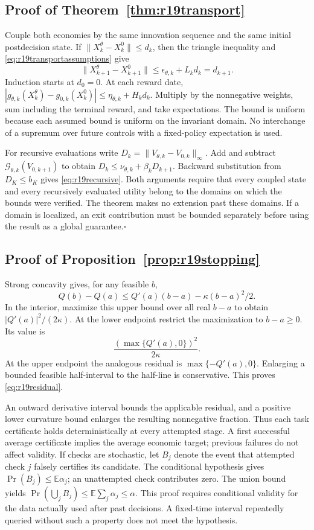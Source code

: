 \documentclass[ecta,nameyear,draft]{econsocart}
\theoremstyle{definition}
\theoremstyle{remark}
\newcommand{\E}{\mathbb E}
\begin{document}
\subsection{Proof of Theorem~\ref{thm:r19transport}}
Couple both economies by the same innovation sequence and the same initial
postdecision state. If $\|X_k^\theta-X_k^0\|\leq d_k$, then the triangle
inequality and \eqref{eq:r19transportassumptions} give
\[
 \|X_{k+1}^\theta-X_{k+1}^0\|
 \leq\epsilon_{\theta,k}+L_kd_k=d_{k+1}.
\]
Induction starts at $d_0=0$. At each reward date,
$|g_{\theta,k}(X_k^\theta)-g_{0,k}(X_k^0)|
 \leq\eta_{\theta,k}+H_kd_k$.
Multiply by the nonnegative weights, sum including the terminal reward,
and take expectations. The bound is uniform because each assumed bound is
uniform on the invariant domain. No interchange of a supremum over future
controls with a fixed-policy expectation is used.

For recursive evaluations write
$D_k=\|V_{\theta,k}-V_{0,k}\|_\infty$. Add and subtract
$\mathcal G_{\theta,k}(V_{0,k+1})$ to obtain
$D_k\leq\nu_{\theta,k}+\beta_kD_{k+1}$.
Backward substitution from $D_K\leq b_K$ gives
\eqref{eq:r19recursive}. Both arguments require that every coupled state
and every recursively evaluated utility belong to the domains on which the
bounds were verified. The theorem makes no extension past these domains.
If a domain is localized, an exit contribution must be bounded separately
before using the result as a global guarantee.\hfill$\square$

\subsection{Proof of Proposition~\ref{prop:r19stopping}}
Strong concavity gives, for any feasible $b$,
\[
 Q(b)-Q(a)\leq Q'(a)(b-a)-\kappa(b-a)^2/2.
\]
In the interior, maximize this upper bound over all real $b-a$ to obtain
$|Q'(a)|^2/(2\kappa)$. At the lower endpoint restrict the maximization to $b-a\geq0$.
Its value is
\[
 \frac{(\max\{Q'(a),0\})^2}{2\kappa}.
\]
At the upper endpoint the analogous residual is $\max\{-Q'(a),0\}$. Enlarging a bounded
feasible half-interval to the half-line is conservative. This proves
\eqref{eq:r19residual}.

An outward derivative interval bounds the applicable residual, and a positive
lower curvature bound enlarges the resulting nonnegative fraction. Thus each
task certificate holds deterministically at every attempted stage. A first
successful average certificate implies the average economic target; previous
failures do not affect validity. If checks are stochastic, let $B_j$ denote
the event that attempted check $j$ falsely certifies its candidate. The
conditional hypothesis gives $\Pr(B_j)\leq\E\alpha_j$; an unattempted
check contributes zero. The union bound yields
$\Pr(\bigcup_jB_j)\leq\E\sum_j\alpha_j\leq\alpha$. This proof requires
conditional validity for the data actually used after past decisions.
A fixed-time interval repeatedly queried without such a property does not
meet the hypothesis.
\end{document}
